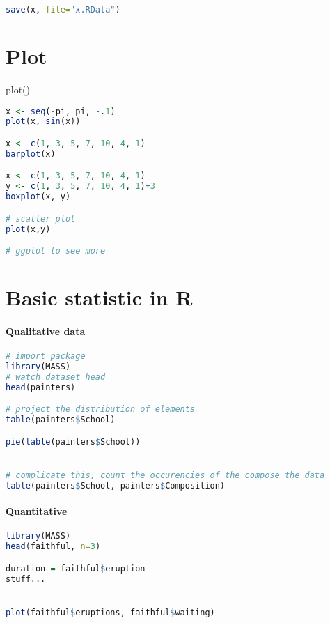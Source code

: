 \documentclass[11pt]{article}
\begin{document}
\begin{lstlisting}[language=R]
save(x, file="x.RData")
\end{lstlisting}


\section{Plot} %
\label{sec:plot}
plot()
\begin{lstlisting}[language=R]
x <- seq(-pi, pi, -.1)
plot(x, sin(x))

x <- c(1, 3, 5, 7, 10, 4, 1)
barplot(x)

x <- c(1, 3, 5, 7, 10, 4, 1)
y <- c(1, 3, 5, 7, 10, 4, 1)+3
boxplot(x, y)

# scatter plot
plot(x,y)

# ggplot to see more
\end{lstlisting}



\section{Basic statistic in R} %
\label{sec:basic_statistic_in_r}
\paragraph{Qualitative data} %
\label{par:qualitative_data}
\begin{lstlisting}[language=R]
# import package
library(MASS)
# watch dataset head
head(painters)

# project the distribution of elements
table(painters$School)

pie(table(painters$School))


# complicate this, count the occurencies of the compose the data
table(painters$School, painters$Composition)
\end{lstlisting}

\paragraph{Quantitative} %
\label{par:quantitative}
\begin{lstlisting}[language=R]
library(MASS)
head(faithful, n=3)

duration = faithful$eruption
stuff...


plot(faithful$eruptions, faithful$waiting)
\end{lstlisting}
\end{document}
